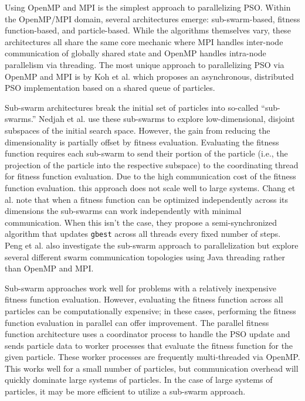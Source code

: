 Using OpenMP and MPI is the simplest approach to parallelizing PSO. Within the
OpenMP/MPI domain, several architectures emerge: sub-swarm-based, fitness
function-based, and particle-based. While the algorithms themselves vary, these
architectures all share the same core mechanic where MPI handles inter-node
communication of globally shared state and OpenMP handles intra-node parallelism
via threading. The most unique approach to parallelizing PSO via OpenMP and MPI is by Koh et
al. \cite{papso} which proposes an asynchronous, distributed PSO implementation
based on a shared queue of particles. 

Sub-swarm architectures break the initial set of particles into so-called
``sub-swarms.'' Nedjah et al. \cite{comppso} use these sub-swarms to explore
low-dimensional, disjoint subspaces of the initial search space. However,
the gain from reducing the dimensionality is partially offset by fitness
evaluation.
Evaluating the fitness function requires each sub-swarm to send their portion
of the particle (i.e., the projection of the particle into the respective
subspace) to the coordinating thread for fitness function evaluation.
Due to the high
communication cost of the fitness function evaluation. this approach does not
scale well to large systems. Chang et al. \cite{ppso} note that when a fitness
function can be optimized independently across its dimensions the sub-swarms can
work independently with minimal communication. When this isn't the case, they
propose a semi-synchronized algorithm that updates \texttt{gbest} across all
threads every fixed number of steps. Peng et al. \cite{multicore-pso} also
investigate the sub-swarm approach to
parallelization but explore several different swarm communication topologies using
Java threading rather than OpenMP and MPI.

Sub-swarm approaches work well for problems with a relatively inexpensive
fitness function evaluation. However, evaluating the fitness function across all
particles can be computationally expensive; in these cases, performing the
fitness function evaluation in parallel can offer improvement. The parallel
fitness function architecture \cite{pgpso, ppso-fd} uses a coordinator process
to handle the PSO update and sends particle data to worker processes that
evaluate the fitness function for the given particle. These worker processes are
frequently multi-threaded via OpenMP.
This works well for a small number of particles, but communication
overhead will quickly dominate large systems of particles. In the case of large
systems of particles, it may be more efficient to utilize a sub-swarm approach.


